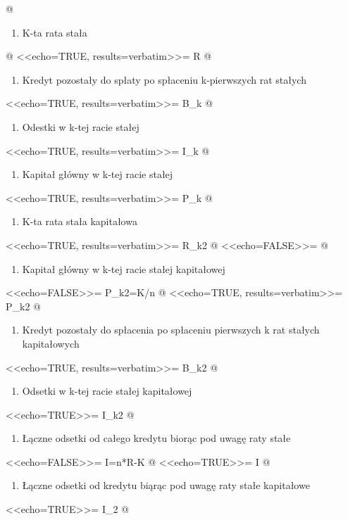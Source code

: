 \documentclass{article}
\begin{document}
@ 
\begin{enumerate}
\item[] { K-ta rata stała}
\end{enumerate}
@
<<echo=TRUE, results=verbatim>>=
R
@
\begin{enumerate}
\item[] {Kredyt pozostały do spłaty po spłaceniu k-pierwszych rat stałych}
\end{enumerate}
<<echo=TRUE, results=verbatim>>=
B_k
@
\begin{enumerate}
\item[] {Odestki w k-tej racie stałej}
\end{enumerate}
<<echo=TRUE, results=verbatim>>=
I_k
@
\begin{enumerate}
\item[]{ Kapitał główny w k-tej racie stałej}
\end{enumerate}
<<echo=TRUE, results=verbatim>>=
P_k
@
\begin{enumerate}
\item[]{ K-ta rata stała kapitałowa }
\end{enumerate}
<<echo=TRUE, results=verbatim>>=
R_k2
@
<<echo=FALSE>>=
@
\begin{enumerate}
\item[]{ Kapitał główny w k-tej racie stałej kapitałowej}
\end{enumerate}


<<echo=FALSE>>=
P_k2=K/n
@
<<echo=TRUE, results=verbatim>>=
P_k2
@
\begin{enumerate}
\item[]{ Kredyt pozostały do spłacenia po spłaceniu pierwszych k rat stałych kapitałowych}
\end{enumerate}
<<echo=TRUE, results=verbatim>>=
B_k2
@
\begin{enumerate}
\item[]{ Odsetki w k-tej racie stałej kapitałowej}
\end{enumerate}


<<echo=TRUE>>=
I_k2
@



\noindent{\large\textbf{}}



\bigskip
\noindent{\large\textbf{}}

\bigskip
\noindent{\large\textbf{}}

\bigskip
\noindent{\large\textbf{}}

\bigskip
\noindent{\large\textbf{}}

\begin{enumerate}
\item[]{ Łączne odsetki od całego kredytu biorąc pod uwagę raty stałe}
\end{enumerate}
<<echo=FALSE>>=
I=n*R-K
@
<<echo=TRUE>>=
I
@
\begin{enumerate}
\item[]{ Łączne odsetki od kredytu biąrąc pod uwagę raty stałe kapitałowe}
\end{enumerate}
<<echo=TRUE>>=
I_2
@
\bigskip
\end{document}
